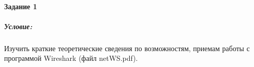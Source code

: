 \paragraph{Задание 1}
\subparagraph{Условие:}
Изучить краткие теоретические сведения по возможностям, приемам работы с программой Wireshark (файл netWS.pdf).